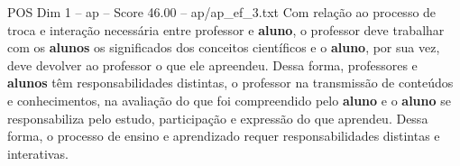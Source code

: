 \begin{textsample}{POS Dim 1 – ap – Score 46.00 – ap/ap\_ef\_3.txt}
Com relação ao processo de troca e interação necessária entre professor e \textbf{aluno}, o professor deve trabalhar com os \textbf{alunos} os significados dos conceitos científicos e o \textbf{aluno}, por sua vez, deve devolver ao professor o que ele apreendeu.
Dessa forma, professores e \textbf{alunos} têm responsabilidades distintas, o professor na transmissão de conteúdos e conhecimentos, na avaliação do que foi compreendido pelo \textbf{aluno} e o \textbf{aluno} se responsabiliza pelo estudo, participação e expressão do que aprendeu.
Dessa forma, o processo de ensino e aprendizado requer responsabilidades distintas e interativas.

\end{textsample}
